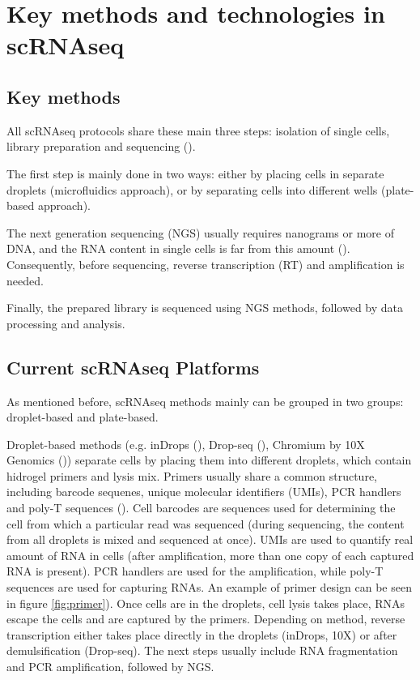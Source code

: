 \section{Key methods and technologies in scRNAseq}

\subsection{Key methods}

All scRNAseq protocols share these main three steps:
isolation of single cells, library preparation and sequencing (\cite{Andrews2018}).

The first step is mainly done in two ways:
either by placing cells in separate droplets (microfluidics approach),
or by separating cells into different wells (plate-based approach).

The next generation sequencing (NGS) usually requires nanograms or more of DNA,
and the RNA content in single cells is far from this amount (\cite{Wu2017}).
Consequently, before sequencing, reverse transcription (RT) and amplification is needed.

Finally, the prepared library is sequenced using NGS methods,
followed by data processing and analysis.

\subsection{Current scRNAseq Platforms}

As mentioned before, scRNAseq methods mainly can be grouped in two groups: droplet-based and plate-based.

Droplet-based methods (e.g. inDrops (\cite{Klein2015}), Drop-seq (\cite{Macosko2015}),
Chromium by 10X Genomics (\cite{Zheng2017}))
separate cells by placing them into different droplets, which contain hidrogel primers and lysis mix.
Primers usually share a common structure, including barcode sequenes, unique molecular identifiers (UMIs),
PCR handlers and poly-T sequences (\cite{Zhang2019}).
Cell barcodes are sequences used for determining the cell from which a particular read was sequenced
(during sequencing, the content from all droplets is mixed and sequenced at once).
UMIs are used to quantify real amount of RNA in cells
(after amplification, more than one copy of each captured RNA is present).
PCR handlers are used for the amplification, while poly-T sequences are used for capturing RNAs.
An example of primer design can be seen in figure \ref{fig:primer}).
Once cells are in the droplets, cell lysis takes place, RNAs escape the cells and are captured by the primers.
Depending on method,
reverse transcription either takes place directly in the droplets (inDrops, 10X) or after demulsification (Drop-seq).
The next steps usually include RNA fragmentation and PCR amplification, followed by NGS.

